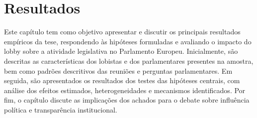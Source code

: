 \chapter{Resultados}
\label{chapter:resultados}
Este capítulo tem como objetivo apresentar e discutir os principais resultados empíricos da tese, respondendo às hipóteses formuladas e avaliando o impacto do lobby sobre a atividade legislativa no Parlamento Europeu. Inicialmente, são descritas as características dos lobistas e dos parlamentares presentes na amostra, bem como padrões descritivos das reuniões e perguntas parlamentares. Em seguida, são apresentados os resultados dos testes das hipóteses centrais, com análise dos efeitos estimados, heterogeneidades e mecanismos identificados. Por fim, o capítulo discute as implicações dos achados para o debate sobre influência política e transparência institucional.





